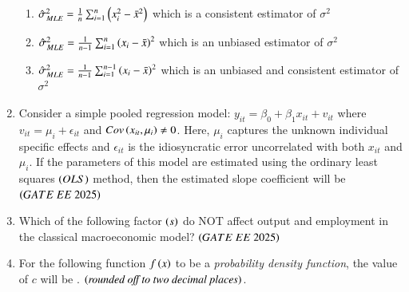 \documentclass[journal,12pt,onecolumn]{IEEEtran}
\theoremstyle{remark}
\begin{document}
\begin{enumerate}
\begin{enumerate}
    \item $\hat{\sigma}_{MLE}^2 = \frac{1}{n}\sum_{i=1}^{n} \left(x_i^2-\bar{x}^2\right)$ which is a consistent estimator of $\sigma^2$
    \item $\hat{\sigma}_{MLE}^2 = \frac{1}{n-1}\sum_{i=1}^{n} \left(x_i-\bar{x}\right)^2$ which is an unbiased estimator of $\sigma^2$
    \item $\hat{\sigma}_{MLE}^2 = \frac{1}{n-1}\sum_{i=1}^{n-1} \left(x_i-\bar{x}\right)^2$ which is an unbiased and consistent estimator of $\sigma^2$
  \end{enumerate}
\item Consider a simple pooled regression model: $y_{it} = \beta_0 + \beta_1 x_{it} + v_{it}$ where $v_{it} = \mu_i + \epsilon_{it}$ and $Cov \left(x_{it},\mu_{i}\right) \neq 0$. Here, $\mu_{i}$ captures the unknown individual specific effects and $\epsilon_{it}$ is the idiosyncratic error uncorrelated with both $x_{it}$ and $\mu_{i}$. If the parameters of this model are estimated using the ordinary least squares  $\left(OLS\right)$ method, then the estimated slope coefficient will be
\hfill $\left(GATE\ EE\ 2025\right)$
    \begin{enumerate}
      \end{enumerate}
\item Which of the following factor $\left(s\right)$ do NOT affect output and employment in the classical macroeconomic model?
\hfill $\left(GATE\ EE\ 2025\right)$
    \begin{enumerate}
      \end{enumerate}
\item For the following function $f \left(x\right)$ to be a \textit{probability density function}, the value of $c$ will be \underline{\hspace{2cm}}.  $\left(\textit{rounded off to two decimal places}\right)$.

\end{enumerate}
\end{document}
